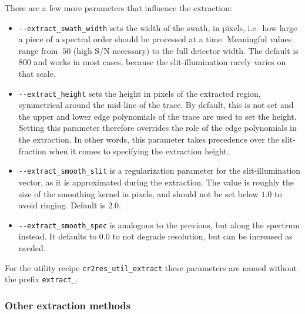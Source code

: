 
There are a few more parameters that influence the extraction:
\begin{itemize}
    \item \verb!--extract_swath_width! sets the width of the swath, in pixels,
    i.e.~how large a piece of a spectral order should be processed at a time.
    Meaningful values range from $~50$ (high S/N necessary) to the full detector
    width. The default is $800$ and works in most cases, because the
    slit-illumination rarely varies on that scale.
    \item \verb!--extract_height! sets the height in pixels of the extracted
    region, symmetrical around the mid-line of the trace. By default, this is
    not set and the upper and lower edge polynomials of the trace are used to
    set the height. Setting this parameter therefore overrides the role of the edge polynomials in the extraction. In other words, this parameter takes precedence over the slit-fraction when it comes to
    specifying the extraction height.
    \item \verb!--extract_smooth_slit! is a regularization parameter for the
    slit-illumination vector, as it is approximated during the extraction. The
    value is roughly the size of the smoothing kernel in pixels, and should not
    be set below $1.0$ to avoid ringing. Default is $2.0$.
    \item \verb!--extract_smooth_spec! is analogous to the previous, but along
    the spectrum instead. It defaults to $0.0$ to not degrade resolution, but
    can be increased as needed.
\end{itemize}

For the utility recipe \verb!cr2res_util_extract! these parameters are named
without the prefix \verb!extract_!.

\subsubsection{Other extraction methods}
\label{sec:otherextr}

